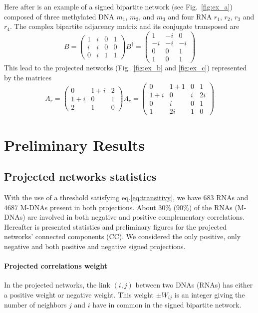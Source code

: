 \documentclass[10pt,a4paper]{article}
\begin{document}
Here after is an example of a signed bipartite network (see Fig.~\ref{fig:ex_a}) composed of three methylated DNA $m_{1}$, $m_{2}$, and $m_{3}$ and four RNA $r_{1}$, $r_{2}$, $r_{3}$ and $r_{4}$. The complex bipartite adjacency matrix and its conjugate transposed are
\begin{equation}
B=\begin{pmatrix}
1&i&0&1\\
i&i&0&0\\
0&i&1&1
\end{pmatrix}
B^{\dagger}=\begin{pmatrix}
1&-i&0\\
-i&-i&-i\\
0&0&1\\
1&0&1
\end{pmatrix}
\label{eq:example}
\end{equation}
This lead to the projected networks (Fig.~\ref{fig:ex_b} and \ref{fig:ex_c}) represented by the matrices
\begin{equation}
A_{r}=\begin{pmatrix}
0&1+i&2\\
1+i&0&1\\
2&1&0
\end{pmatrix}
A_{c}=\begin{pmatrix}
0&1+1&0&1\\
1+i&0&i&2i\\
0&i&0&1\\
1&2i&1&0
\end{pmatrix}
\label{eq:example2}
\end{equation}

\section{Preliminary Results}

\subsection{Projected networks statistics}
With the use of a threshold satisfying eq.\ref{eq:transitivy}, we have $683$ RNAs and $4687$ M-DNAs present in both projections. About $30\%$ ($90\%$) of the RNAs (M-DNAs) are involved in both negative and positive complementary correlations. Hereafter is presented statistics and preliminary figures for the projected networks' connected components (CC). We considered the only positive, only negative and both positive and negative signed projections.
\paragraph{Projected correlations weight}
In the projected networks, the link $(i,j)$ between two DNAs (RNAs) has either a positive weight or negative weight. This weight $\pm W_{ij}$ is an integer giving the number of neighbors $j$ and $i$ have in common in the signed bipartite network.\\
\end{document}

